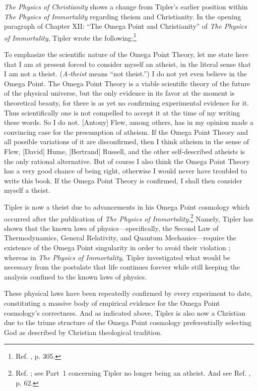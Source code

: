 \documentclass[letterpaper,12pt]{article}
\newenvironment{squote}
  {\small\quote}
  {\endquote\normalsize}
\begin{document}
\emph{The Physics of Christianity} shows a change from Tipler's earlier position within \emph{The Physics of Immortality} regarding theism and Christianity. In the opening paragraph of Chapter XII: ``The Omega Point and Christianity'' of \emph{The Physics of Immortality}, Tipler wrote the following:\footnote{Ref. , p. 305.}

\begin{squote}
To emphasize the scientific nature of the Omega Point Theory, let me state here that I am at present forced to consider myself an atheist, in the literal sense that I am not a theist. (\emph{A-theist} means ``not theist.'') I do not yet even believe in the Omega Point. The Omega Point Theory is a viable scientific theory of the future of the physical universe, but the only evidence in its favor at the moment is theoretical beauty, for there is as yet no confirming experimental evidence for it. Thus scientifically one is not compelled to accept it at the time of my writing these words. So I do not. [Antony] Flew, among others, has in my opinion made a convincing case for the presumption of atheism. If the Omega Point Theory and all possible variations of it are disconfirmed, then I think atheism in the sense of Flew, [David] Hume, [Bertrand] Russell, and the other self-described atheists is the only rational alternative. But of course I also think the Omega Point Theory has a very good chance of being right, otherwise I would never have troubled to write this book. If the Omega Point Theory is confirmed, I shall then consider myself a theist.
\end{squote}

Tipler is now a theist due to advancements in his Omega Point cosmology which occurred after the publication of \emph{The Physics of Immortality}.\footnote{Ref. ; see Part~1 concerning Tipler no longer being an atheist. And see Ref. , p. 62.} Namely, Tipler has shown that the known laws of physics---specifically, the Second Law of Thermodynamics, General Relativity, and Quantum Mechanics---require the existence of the Omega Point singularity in order to avoid their violation \cite{Tipler1997,Tipler1998,TiplerEtAl2000,Tipler2000b,Tipler2001b,Tipler2003a,Tipler2003b,Tipler2005,Tipler2007}; whereas in \emph{The Physics of Immortality}, Tipler investigated what would be necessary from the postulate that life continues forever while still keeping the analysis confined to the known laws of physics.

These physical laws have been repeatedly confirmed by every experiment to date, constituting a massive body of empirical evidence for the Omega Point cosmology's correctness. And as indicated above, Tipler is also now a Christian due to the triune structure of the Omega Point cosmology preferentially selecting God as described by Christian theological tradition.
\end{document}
